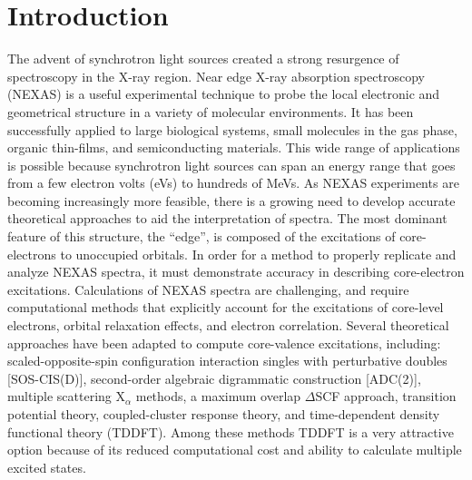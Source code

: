 \documentclass[11.5pt]{article}
\begin{document}
  \doublespacing
\section{Introduction}
The advent of synchrotron light sources created a strong resurgence of spectroscopy in the X-ray region. \cite{mcmillan_synchrotronproposed_1945} Near edge X-ray absorption spectroscopy (NEXAS) is a useful experimental technique to probe the local electronic and geometrical structure in a variety of molecular environments. It has been successfully applied to large biological systems, \cite{hua_refinement_2010} small molecules in the gas phase,\cite{contini_gas-phase_2001} organic thin-films,\cite{hahner_near_2006} and semiconducting materials.\cite{guo_electronic_2011} This wide range of applications is possible because synchrotron light sources can span an energy range that goes from a few electron volts (eVs) \cite{feneberg_synchrotron-based_2011} to hundreds of MeVs.\cite{nakazato_observation_1989} As NEXAS experiments are becoming increasingly more feasible, there is a growing need to develop accurate theoretical approaches to aid the interpretation of spectra.
The most dominant feature of this structure, the ``edge'', is composed of the excitations of core-electrons to unoccupied orbitals. In order for a method to properly replicate and analyze NEXAS spectra, it must demonstrate accuracy in describing core-electron excitations. 
Calculations of NEXAS spectra are challenging, and require computational methods that explicitly account for the excitations of core-level electrons, orbital relaxation effects, and electron correlation. \cite{coriani_coupled-cluster_2012} Several theoretical approaches have been adapted to compute core-valence excitations, including: scaled-opposite-spin configuration interaction singles with perturbative doubles [SOS-CIS(D)],\cite{asmuruf_calculation_2008} second-order algebraic digrammatic construction [ADC(2)],\cite{schirmer_beyond_1982,trofimov_efficient_1995} multiple scattering X$_\alpha$ methods, \cite{sheehy_correlation_1989} a maximum overlap $\Delta$SCF approach, \cite{besley_self-consistent-field_2009} transition potential theory,\cite{triguero_calculations_1998} coupled-cluster response theory, \cite{coriani_coupled-cluster_2012} and time-dependent density functional theory (TDDFT).\cite{stener_time_2003} Among these methods TDDFT is a very attractive option because of its reduced computational cost and ability to calculate multiple excited states.
\end{document}
